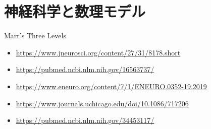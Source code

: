 \section{神経科学と数理モデル}
Marr's Three Levels
\begin{itemize}
\item \url{https://www.jneurosci.org/content/27/31/8178.short}
\item \url{https://pubmed.ncbi.nlm.nih.gov/16563737/}
\item \url{https://www.eneuro.org/content/7/1/ENEURO.0352-19.2019}
\item \url{https://www.journals.uchicago.edu/doi/10.1086/717206}
\item \url{https://pubmed.ncbi.nlm.nih.gov/34453117/}
\end{itemize}
